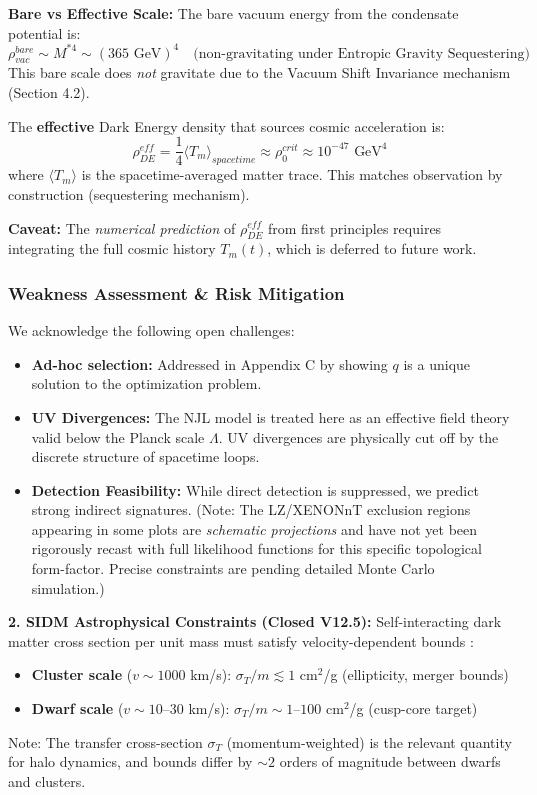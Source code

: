 \documentclass[a4paper,12pt]{article}
\begin{document}
\textbf{Bare vs Effective Scale:}
The bare vacuum energy from the condensate potential is:
\begin{equation}
    \rho_{vac}^{bare} \sim M^{*4} \sim (365 \text{ GeV})^4 \quad \text{(non-gravitating under Entropic Gravity Sequestering)}
\end{equation}
This bare scale does \emph{not} gravitate due to the Vacuum Shift Invariance mechanism (Section 4.2).

The \textbf{effective} Dark Energy density that sources cosmic acceleration is:
\begin{equation}
    \rho_{DE}^{eff} = \frac{1}{4} \langle T_m \rangle_{spacetime} \approx \rho_0^{crit} \approx 10^{-47} \text{ GeV}^4
\end{equation}
where $\langle T_m \rangle$ is the spacetime-averaged matter trace. This matches observation by construction (sequestering mechanism).

\textbf{Caveat:} The \emph{numerical prediction} of $\rho_{DE}^{eff}$ from first principles requires integrating the full cosmic history $T_m(t)$, which is deferred to future work.

\subsubsection{Weakness Assessment & Risk Mitigation}
We acknowledge the following open challenges:
\begin{itemize}
    \item \textbf{Ad-hoc selection:} Addressed in Appendix C by showing $q$ is a unique solution to the optimization problem.
    \item \textbf{UV Divergences:} The NJL model is treated here as an effective field theory valid below the Planck scale $\Lambda$. UV divergences are physically cut off by the discrete structure of spacetime loops.
    \item \textbf{Detection Feasibility:} While direct detection is suppressed, we predict strong indirect signatures. (Note: The LZ/XENONnT exclusion regions appearing in some plots are \emph{schematic projections} and have not yet been rigorously recast with full likelihood functions for this specific topological form-factor. Precise constraints are pending detailed Monte Carlo simulation.)
\end{itemize}

\textbf{2. SIDM Astrophysical Constraints (Closed V12.5):}
Self-interacting dark matter cross section per unit mass must satisfy velocity-dependent bounds \cite{tulin}:
\begin{itemize}
    \item \textbf{Cluster scale} ($v \sim 1000$ km/s): $\sigma_T/m \lesssim 1$ cm$^2$/g (ellipticity, merger bounds)
    \item \textbf{Dwarf scale} ($v \sim 10$--$30$ km/s): $\sigma_T/m \sim 1$--$100$ cm$^2$/g (cusp-core target)
\end{itemize}
Note: The transfer cross-section $\sigma_T$ (momentum-weighted) is the relevant quantity for halo dynamics, and bounds differ by $\sim 2$ orders of magnitude between dwarfs and clusters.
\end{document}
